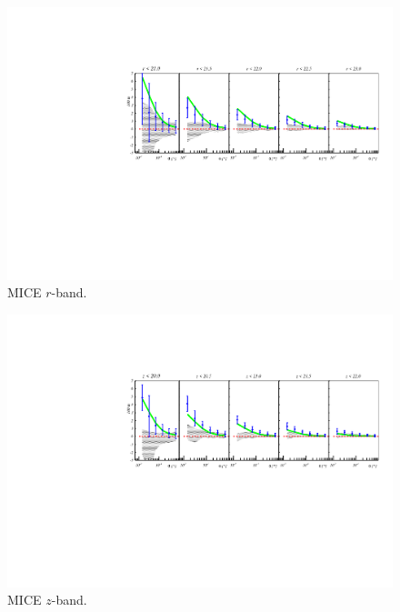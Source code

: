\begin{figure}
\includegraphics[width=\textwidth,trim={0 2.3cm 0 3.5cm},clip]{./figures_appendix/mag_r_MICE.pdf}
\caption{MICE $r$-band.}
\end{figure}

\begin{figure}
\includegraphics[width=\textwidth,trim={0 2.3cm 0 3.5cm},clip]{./figures_appendix/mag_z_MICE.pdf}
\caption{MICE $z$-band.}
\end{figure}

